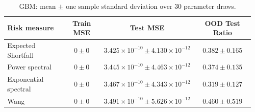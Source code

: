 \begin{table}[ht]
    \centering
    \begin{tabular}{lccc}
        \toprule
        Risk measure & Train MSE & Test MSE & OOD Test Ratio \\
        \midrule
        Expected Shortfall & $0\pm 0$ & $3.425\times 10^{-10}\pm 4.130\times 10^{-12}$ & $0.382\pm 0.165$ \\
        Power spectral & $0\pm 0$ & $3.445\times 10^{-10}\pm 4.463\times 10^{-12}$ & $0.374\pm 0.135$ \\
        Exponential spectral & $0\pm 0$ & $3.467\times 10^{-10}\pm 4.343\times 10^{-12}$ & $0.319\pm 0.127$ \\
        Wang & $0\pm 0$ & $3.491\times 10^{-10}\pm 5.626\times 10^{-12}$ & $0.460\pm 0.519$ \\
        \bottomrule
    \end{tabular}
    \caption{GBM: mean $\pm$ one sample standard deviation over 30 parameter draws.}
    \label{tab:risk-gbm}
\end{table}
